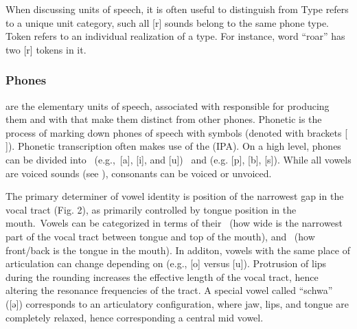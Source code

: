 \documentclass[letterpaper,10pt,english]{jupyterBook}
\begin{document}
\sphinxAtStartPar
When discussing units of speech, it is often useful to distinguish  from  Type refers to a unique unit category, such
all {[}r{]} sounds belong to the same phone type. Token refers to an
individual realization of a type. For instance, word “roar” has two
{[}r{]} tokens in it.


\subsubsection{Phones}
\label{\detokenize{Introduction/Linguistic_structure_of_speech:phones}}
\sphinxAtStartPar
{} are the
elementary units of speech, associated with 
responsible for producing them and with  that make them
distinct from other phones. Phonetic  is the process of
marking down phones of speech with symbols (denoted with brackets {[}
{]}). Phonetic transcription often makes use of the 
(IPA). On a high level, phones can be divided into 
(e.g., {[}a{]}, {[}i{]}, and {[}u{]})  and  (e.g.\sphinxstyleemphasis{,} {[}p{]}, {[}b{]},
{[}s{]}). While all vowels are voiced sounds (see {\hyperref[\detokenize{Introduction/Speech_production_and_acoustic_properties::doc}]{}}), consonants can
be voiced or unvoiced.

\sphinxAtStartPar
The primary determiner of vowel identity is position of the narrowest
gap in the vocal tract (Fig. 2), as primarily controlled by tongue
position in the mouth. Vowels can be categorized in terms of
their  (how wide is the narrowest part of the vocal
tract between tongue and top of the mouth), and 
(how front/back is the tongue in the mouth). In additon, vowels with the
same place of articulation can change depending on  (e.g.,
{[}o{]} versus {[}u{]}). Protrusion of lips during the rounding increases
the effective length of the vocal tract, hence altering the resonance
frequencies of the tract. A special vowel called “schwa” ({[}ə{]})
corresponds to an articulatory configuration, where jaw, lips, and
tongue are completely relaxed, hence corresponding a central mid vowel.
\end{document}
